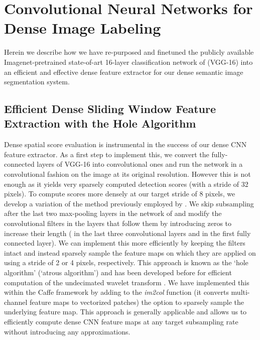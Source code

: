 \section{Convolutional Neural Networks for Dense Image Labeling}
\label{sec:convnets}


Herein we describe how we have re-purposed and finetuned the publicly
available Imagenet-pretrained state-of-art 16-layer classification network of
\cite{simonyan2014very} (VGG-16) into an efficient and effective dense feature
extractor for our dense semantic image segmentation system.

\subsection{Efficient Dense Sliding Window Feature Extraction with the Hole Algorithm}
\label{sec:convnet-hole}

Dense spatial score evaluation is instrumental in the success of our dense CNN
feature extractor. As a first step to implement this, we convert the
fully-connected layers of VGG-16 into convolutional ones and run the network
in a convolutional fashion on the image at its original resolution. However
this is not enough as it yields very sparsely computed detection scores (with
a stride of 32 pixels). To compute scores more densely at our target stride of
8 pixels, we develop a variation of the method previously employed by
\citet{GCMG+13, sermanet2013overfeat}. We skip subsampling after the last two
max-pooling layers in the network of \citet{simonyan2014very} and modify the
convolutional filters in the layers that follow them by introducing zeros to
increase their length ( in the last three convolutional layers and
 in the first fully connected layer). We can implement this more
efficiently by keeping the filters intact and instead sparsely sample the
feature maps on which they are applied on using a stride of 2 or 4 pixels,
respectively. This approach is known as the `hole algorithm' (`atrous
algorithm') and has been developed before for efficient computation of the
undecimated wavelet transform \cite{Mall99}. We have implemented this within
the Caffe framework \citep{jia2014caffe} by adding to the \textsl{im2col}
function (it converts multi-channel feature maps to vectorized patches) the
option to sparsely sample the underlying feature map. This approach is
generally applicable and allows us to efficiently compute dense CNN feature
maps at any target subsampling rate without introducing any approximations.

